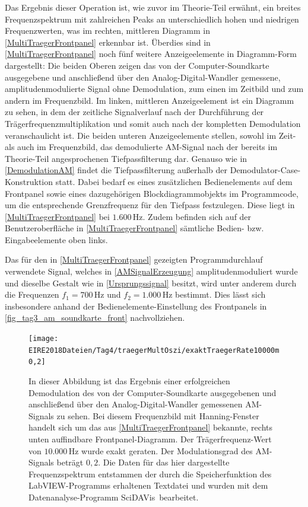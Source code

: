 \documentclass[
a4paper,
12pt,
pagesize,
ngerman
]{scrartcl}
\begin{document}
	\noindent Das Ergebnis dieser Operation ist, wie zuvor im Theorie-Teil erwähnt, ein breites Frequenzspektrum mit zahlreichen Peaks an unterschiedlich hohen und niedrigen Frequenzwerten, was im rechten, mittleren Diagramm in \cref{MultiTraegerFrontpanel} erkennbar ist. 
	Überdies sind in \cref{MultiTraegerFrontpanel} noch fünf weitere Anzeigeelemente in Diagramm-Form dargestellt: Die beiden Oberen zeigen das von der Computer-Soundkarte ausgegebene und anschließend über den Analog-Digital-Wandler gemessene, amplitudenmodulierte Signal ohne Demodulation, zum einen im Zeitbild und zum andern im Frequenzbild.
	Im linken, mittleren Anzeigeelement ist ein Diagramm zu sehen, in dem der zeitliche Signalverlauf nach der Durchführung der Trägerfrequenzmultiplikation und somit auch nach der kompletten Demodulation veranschaulicht ist. 
	Die beiden unteren Anzeigeelemente stellen, sowohl im Zeit- als auch im Frequenzbild, das demodulierte AM-Signal nach der bereits im Theorie-Teil angesprochenen Tiefpassfilterung dar. 
	Genauso wie in \cref{DemodulationAM} findet die Tiefpassfilterung außerhalb der Demodulator-Case-Konstruktion statt. 
	Dabei bedarf es eines zusätzlichen Bedienelements auf dem Frontpanel sowie eines dazugehörigen Blockdiagrammobjekts im Programmcode, um die entsprechende Grenzfrequenz für den Tiefpass festzulegen. 
	Diese liegt in \cref{MultiTraegerFrontpanel} bei $1.600\,$Hz. 
	Zudem befinden sich auf der Benutzeroberfläche in \cref{MultiTraegerFrontpanel} sämtliche Bedien- bzw. Eingabeelemente oben links.
	
	Das für den in \cref{MultiTraegerFrontpanel} gezeigten Programmdurchlauf verwendete Signal, welches in \cref{AMSignalErzeugung} amplitudenmoduliert wurde und dieselbe Gestalt wie in \cref{Ursprungssignal} besitzt, wird unter anderem durch die Frequenzen $f_1 = 700\,$Hz und $f_2 = 1.000\,$Hz bestimmt. 
	Dies lässt sich insbesondere anhand der Bedienelemente-Einstellung des Frontpanels in \cref{fig_tag3_am_soundkarte_front} nachvollziehen. 
				
	\begin{figure}[H]
		\centering
		\texttt{[image: EIRE2018Dateien/Tag4/traegerMultOszi/exaktTraegerRate10000m0,2]}
		\caption{In dieser Abbildung ist das Ergebnis einer erfolgreichen Demodulation des von der Computer-Soundkarte ausgegebenen und anschließend über den Analog-Digital-Wandler gemessenen AM-Signals zu sehen. Bei diesem Frequenzbild mit Hanning-Fenster handelt sich um das aus \cref{MultiTraegerFrontpanel} bekannte, rechts unten auffindbare Frontpanel-Diagramm. Der Trägerfrequenz-Wert von $10.000\,$Hz wurde exakt geraten. Der Modulationsgrad des AM-Signals beträgt $0,2$. Die Daten für das hier dargestellte Frequenzspektrum entstammen der durch die Speicherfunktion des LabVIEW-Programms erhaltenen Textdatei und wurden mit dem Datenanalyse-Programm \glqq SciDAVis\grqq\ bearbeitet.}
		\label{AMDemodsuccm02}
	\end{figure}
\end{document}
